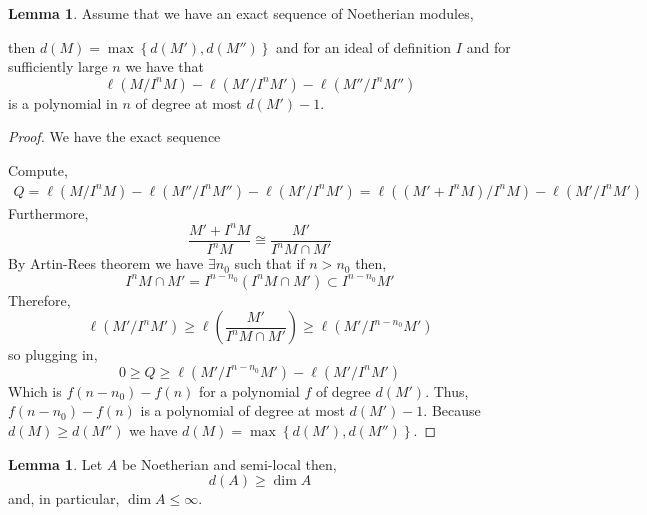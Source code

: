 \documentclass[12pt]{article}
\theoremstyle{remark}
\theoremstyle{definition}
\newtheorem{lemma}[theorem]{Lemma}
\begin{document}
\begin{lemma}
Assume that we have an exact sequence of Noetherian modules,
\begin{center}
\end{center}
then $d(M) = \max{\left\{ d(M'), d(M'') \right\}}$ and for an ideal of definition $I$ and for sufficiently large $n$ we have that
\[ \ell(M / I^n M) - \ell(M'/I^n M') - \ell(M''/I^n M'') \]
is a polynomial in $n$ of degree at most $d(M') - 1$. 
\end{lemma}

\begin{proof}
We have the exact sequence 
\begin{center}
\end{center}
Compute,
\begin{align*}
Q = \ell(M / I^n M) - \ell(M'' / I^n M'') - \ell(M' / I^n M') = \ell((M' + I^n M) / I^n M) - \ell(M'/I^n M')
\end{align*}
Furthermore,
\[ \frac{M' + I^n M}{I^n  M} \cong \frac{M'}{I^n M \cap M'} \]
By Artin-Rees theorem we have $\exists n_0$ such that if $n > n_0$ then,
\[ I^n M \cap M' = I^{n - n_0} \left( I^n M \cap M' \right) \subset I^{n - n_0} M' \]
Therefore,
\[ \ell(M' / I^n M') \ge \ell\left( \frac{M'}{I^n M \cap M'} \right) \ge \ell(M' / I^{n-n_0} M') \]
so plugging in,
\[ 0 \ge  Q \ge \ell(M' / I^{n-n_0} M') - \ell(M'/I^n M') \]
Which is $f(n-n_0) - f(n)$ for a polynomial $f$ of degree $d(M')$. Thus, $f(n-n_0) - f(n)$ is a polynomial of degree at most $d(M') - 1$. Because $d(M) \ge d(M'')$ we have $d(M) = \max\left\{ d(M'), d(M'') \right\}$. 
\end{proof}

\begin{lemma}
Let $A$ be Noetherian and semi-local then,
\[ d(A) \ge \dim{A} \]
and, in particular, $\dim{A} \le \infty$. 
\end{lemma}
\end{document}
